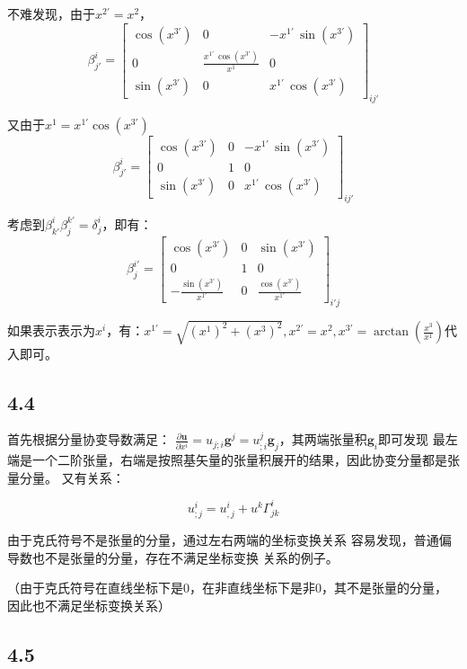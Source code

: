 \documentclass[UTF8,zihao=5]{ctexart}
\newcommand{\bm}[1]{{\mathbf{#1}}}
\newcommand*{\pd}[2]{\frac{\partial #1}{\partial #2}}
\begin{document}
不难发现，由于$x^{2'} = x^2$，
$$
    \beta^i_{j'}=
    \left[\begin{array}{ccc} \cos\left(x^{3'}\right) & 0 & -x^{1'}\,\sin\left(x^{3'}\right)\\ 0 & \frac{x^{1'}\,\cos\left(x^{3'}\right)}{x^{1}} & 0\\ \sin\left(x^{3'}\right) & 0 & x^{1'}\,\cos\left(x^{3'}\right) \end{array}\right]_{ij'}
$$

又由于$x^{1}=x^{1'}\cos(x^{3'})$
$$
    \beta^i_{j'}=
    \left[\begin{array}{ccc} \cos\left(x^{3'}\right) & 0 & -x^{1'}\,\sin\left(x^{3'}\right)\\ 0 & 1 & 0\\ \sin\left(x^{3'}\right) & 0 & x^{1'}\,\cos\left(x^{3'}\right) \end{array}\right]_{ij'}
$$

考虑到$\beta^i_{k'}\beta^{k'}_j=\delta^i_j$，即有：
$$
    \beta^{i'}_j=
    \left[\begin{array}{ccc} \cos\left(x^{3'}\right) & 0 & \sin\left(x^{3'}\right)\\ 0 & 1 & 0\\ -\frac{\sin\left(x^{3'}\right)}{x^{1'}} & 0 & \frac{\cos\left(x^{3'}\right)}{x^{1'}} \end{array}\right]_{i'j}
$$

如果表示表示为$x^i$，有：$x^{1'}=\sqrt{(x^1)^2+(x^3)^2}, x^{2'}=x^2, x^{3'}=\arctan(\frac{x^3}{x^1})$代入即可。

\subsection*{4.4}

首先根据分量协变导数满足：
$\pd{\bm{u}}{x^i}=u_{j;i}\bm{g}^j=u^j_{;i}\bm{g}_j$，其两端张量积$\bm{g}_i$即可发现
最左端是一个二阶张量，右端是按照基矢量的张量积展开的结果，因此协变分量都是张量分量。
又有关系：

$$
    u^i_{;j} = u^i_{,j} + u^k\Gamma_{jk}^i
$$

由于克氏符号不是张量的分量，通过左右两端的坐标变换关系
容易发现，普通偏导数也不是张量的分量，存在不满足坐标变换
关系的例子。

（由于克氏符号在直线坐标下是0，在非直线坐标下是非0，其不是张量的分量，
因此也不满足坐标变换关系）

\subsection*{4.5}
\end{document}
